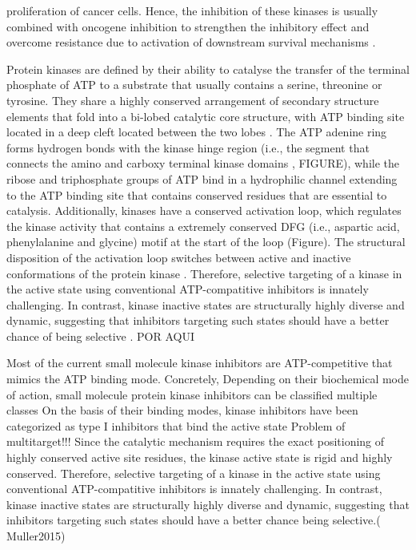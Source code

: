 \documentclass[12pt, a4paper,twoside]{tesi_upf}
\begin{document}
proliferation of cancer cells. Hence, the inhibition of these kinases is usually combined with oncogene inhibition to strengthen the inhibitory effect and overcome resistance due to activation of downstream survival mechanisms \cite{Holohan2013}. 
 
 \par Protein kinases are defined by their ability to catalyse the transfer of the terminal phosphate of ATP to a substrate that usually contains a serine, threonine or tyrosine.  They share a highly conserved arrangement of secondary structure elements that fold into a bi-lobed catalytic core structure, with ATP binding site located in a deep cleft located between the two lobes \cite{Manning2002}. The ATP adenine ring forms hydrogen bonds with the kinase hinge region (i.e., the segment that connects the amino and carboxy terminal kinase domains , FIGURE), while the ribose and triphosphate groups of ATP bind in a hydrophilic channel extending to the ATP binding site that contains conserved residues that are essential to catalysis. Additionally, kinases have a conserved activation loop, which regulates the kinase activity that contains a extremely conserved DFG (i.e., aspartic acid, phenylalanine and glycine) motif at the start of the loop (Figure). The structural disposition of the activation loop switches between active and inactive conformations of the protein kinase \cite{Manning2002}. Therefore, selective targeting of a kinase in the active state using conventional ATP-compatitive inhibitors is innately challenging. In contrast, kinase inactive states are structurally highly diverse and dynamic, suggesting that inhibitors targeting such states should have a better chance of being selective \cite{Muller2015}. POR AQUI
 
 Most of the current small molecule kinase inhibitors are ATP-competitive that mimics the ATP binding mode. Concretely,    
 Depending on their biochemical mode of action, small molecule protein kinase inhibitors can be classified multiple classes
 On the basis of their binding modes, kinase inhibitors have been categorized as type I inhibitors that bind the active state
 Problem of multitarget!!! 
 Since the catalytic mechanism requires the exact positioning of highly conserved active site residues, the kinase active state is rigid and highly conserved. Therefore, selective targeting of a kinase in the active state using conventional ATP-compatitive inhibitors is innately challenging. In contrast, kinase inactive states are structurally highly diverse and dynamic, suggesting that inhibitors targeting such states should have a better chance being selective.( Muller2015)
 
\end{document}
